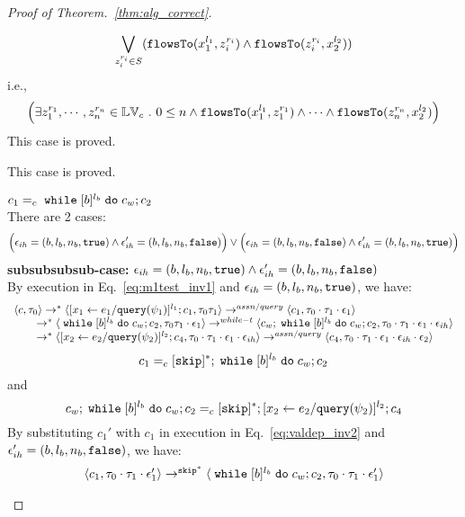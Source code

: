 \begin{proof}[Proof of Theorem.~\ref{thm:alg_correct}]
\begin{case}
\begin{subcase}
\begin{subsubcase}
\begin{subsubsubcase}
\begin{subproof}
\begin{enumerate}
\begin{enumerate}
\[
\bigvee_{z_i^{r_i} \in S} 
(\mathtt{flowsTo}(x_1^{l_1}, z_i^{r_i}) \land \mathtt{flowsTo}(z_i^{r_i}, x_2^{l_2}))
\]
%
i.e.,
\[
\Big(\exists z_1^{r_1}, \cdots, z_n^{r_n} \in \mathbb{LV}_{{c}} ~.~ 0 \leq n 
 \land \mathtt{flowsTo}(x_1^{l_1}, z_1^{r_1}) \land \cdots \land \mathtt{flowsTo}(z_n^{r_n}, {x}_2^{l_2}) \Big)
\]
%
This case is proved.
\end{enumerate}
%
\end{enumerate}
%
This case is proved.
\end{subproof}
%
\begin{subproof} $c_1 =_c \;\mathtt{while}\; [b]^{l_b} \;\mathtt{do}\; c_w;{c}_2$ 
%
\\
There are 2 cases:
$$
\Big(\mathtt{\epsilon}_{ih} = (b, l_b, n_b, \mathtt{true}) \land \mathtt{\epsilon}_{ih}' = (b, l_b, n_b, \mathtt{false}) \Big)
\lor 
\Big(\mathtt{\epsilon}_{ih} = (b, l_b, n_b, \mathtt{false}) \land \mathtt{\epsilon}_{ih}' = (b, l_b, n_b, \mathtt{true}) \Big)
$$
%
\textbf{subsubsubsub-case:} $\mathtt{\epsilon}_{ih} = (b, l_b, n_b, \mathtt{true}) \land \mathtt{\epsilon}_{ih}' = (b, l_b, n_b, \mathtt{false})$
\\
By execution in Eq.~\ref{eq:m1test_inv1} and $\mathtt{\epsilon}_{ih} = (b, l_b, n_b, \mathtt{true})$, we have:
\[
  \begin{array}{l}   
  \langle {c}, \mathtt{\tau}_0 \rangle \rightarrow^{*} 
  \langle [\mathrel{ {x}_1 \leftarrow e_1 / {\tt query}(\psi_1) }]^{l_1} ; {c}_1, \mathtt{\tau}_0 \mathtt{\tau}_1 \rangle  
  \rightarrow^{assn/query}
  \langle c_1, \mathtt{\tau}_0 \cdot \mathtt{\tau}_1 \cdot \mathtt{\epsilon}_1 \rangle 
  \\
  \qquad \rightarrow^{*} 
  \langle \;\mathtt{while}\; [b]^{l_b} \;\mathtt{do}\; c_w;{c}_2, 
  \mathtt{\tau}_0 \mathtt{\tau}_1 \cdot \mathtt{\epsilon}_1 \rangle 
  \rightarrow^{while-t} 
  \langle c_w;\;\mathtt{while}\; [b]^{l_b} \;\mathtt{do}\; c_w; c_2, \mathtt{\tau}_0 \cdot \mathtt{\tau}_1 \cdot \mathtt{\epsilon}_1 \cdot \mathtt{\epsilon}_{ih} \rangle 
  \\
  \qquad \rightarrow^{*} 
  \langle [\mathrel{ {x}_2 \leftarrow e_2 / {\tt query}(\psi_2) }]^{l_2};{c}_4, 
  \mathtt{\tau}_0 \cdot \mathtt{\tau}_1 \cdot \mathtt{\epsilon}_1 \cdot \mathtt{\epsilon}_{ih} \rangle 
  \rightarrow^{assn/query} 
  \langle {c}_4,  \mathtt{\tau}_0 \cdot \mathtt{\tau}_1 \cdot \mathtt{\epsilon}_1 \cdot \mathtt{\epsilon}_{ih} \cdot \mathtt{\epsilon}_2 \rangle 
  \end{array}
\]
% 
\[
  c_1 =_c [\mathtt{skip}]{}^*; \;\mathtt{while}\; [b]^{l_b} \;\mathtt{do}\; c_w;{c}_2
\]
and
\[
  c_w;\;\mathtt{while}\; [b]^{l_b} \;\mathtt{do}\; c_w; c_2 =_c [\mathtt{skip}]{}^*;[\mathrel{ {x}_2 \leftarrow e_2 / {\tt query}(\psi_2) }]^{l_2};{c}_4
\]
%
By substituting $c_1'$ with $c_1$ in execution in Eq.~\ref{eq:valdep_inv2} and $\mathtt{\epsilon}_{ih}' = (b, l_b, n_b, \mathtt{false})$, we have:
  \[
  \begin{array}{l}   
  \langle c_1, \mathtt{\tau}_0 \cdot \mathtt{\tau}_1 \cdot \mathtt{\epsilon}_1' \rangle 
  \rightarrow^{\mathtt{skip}^*} 
  \langle \;\mathtt{while}\; [b]^{l_b} \;\mathtt{do}\; c_w;{c}_2, \mathtt{\tau}_0 \cdot \mathtt{\tau}_1 \cdot \mathtt{\epsilon}_1' \rangle 

\end{array}\]
\end{subproof}
\end{subsubsubcase}
\end{subsubcase}
\end{subcase}
\end{case}
\end{proof}
